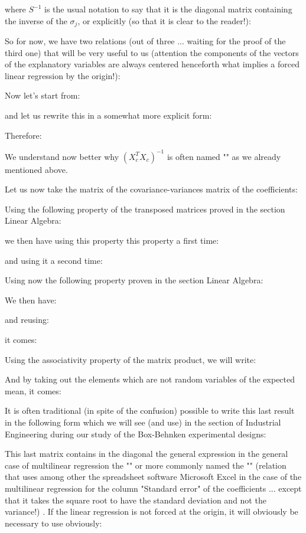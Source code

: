 	where $S^{-1}$ is the usual notation to say that it is the diagonal matrix containing the inverse of the $\sigma_j$, or explicitly (so that it is clear to the reader!):
	
	So for now, we have two relations (out of three ... waiting for the proof of the third one) that will be very useful to us (attention the components of the vectors of the explanatory variables are always centered henceforth what implies a forced linear regression by the origin!):
	
	Now let's start from:
	
 	and let us rewrite this in a somewhat more explicit form:
	
	Therefore:
	
	We understand now better why $(X_c^TX_c)^{-1}$ is often named "" as we already mentioned above.

	Let us now take the matrix of the covariance-variances matrix of the coefficients:
	
 	Using the following property of the transposed matrices proved in the section Linear Algebra:
	
	we then have using this property this property a first time:
	
	and using it a second time:
	
	Using now the following property proven in the section Linear Algebra:
	
	We then have:
	
	and reusing:
	
	it comes:
	
	Using the associativity property of the matrix product, we will write:
	
	And by taking out the elements which are not random variables of the expected mean, it comes:
	
	It is often traditional (in spite of the confusion) possible to write this last result in the following form which we will see (and use) in the section of Industrial Engineering during our study of the Box-Behnken experimental designs:
	
	This last matrix contains in the diagonal the general expression in the general case of multilinear regression the "" or more commonly named the "" (relation that uses among other the spreadsheet software Microsoft Excel in the case of the multilinear regression for the column "Standard error" of the coefficients ... except that it takes the square root to have the standard deviation and not the variance!) . If the linear regression is not forced at the origin, it will obviously be necessary to use obviously:
	

